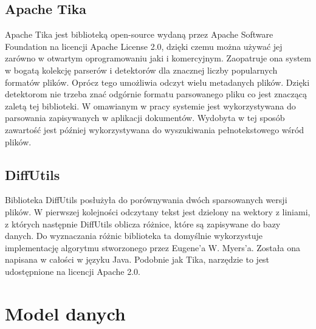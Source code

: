 \subsection*{Apache Tika}

Apache Tika jest biblioteką open-source wydaną przez Apache Software Foundation na licencji Apache License 2.0, dzięki czemu można używać jej zarówno w otwartym oprogramowaniu jaki i komercyjnym. 
Zaopatruje ona system w bogatą kolekcję parserów i detektorów dla znacznej liczby popularnych formatów plików.
Oprócz tego umożliwia odczyt wielu metadanych plików.
Dzięki detektorom nie trzeba znać odgórnie formatu parsowanego pliku co jest znaczącą zaletą tej biblioteki.
W omawianym w pracy systemie jest wykorzystywana do parsowania zapisywanych w aplikacji dokumentów.
Wydobyta w tej sposób zawartość jest później wykorzystywana do wyszukiwania pełnotekstowego wśród plików.

\subsection*{DiffUtils}

Biblioteka DiffUtils posłużyła do porównywania dwóch sparsowanych wersji plików.
W pierwszej kolejności odczytany tekst jest dzielony na wektory z liniami, z których następnie DiffUtils oblicza różnice, które są zapisywane do bazy danych.
Do wyznaczania różnic biblioteka ta domyślnie wykorzystuje implementację algorytmu stworzonego przez Eugene'a W. Myers'a.
Została ona napisana w całości w języku Java.
Podobnie jak Tika, narzędzie to jest udostępnione na licencji Apache 2.0.

\section{Model danych}

